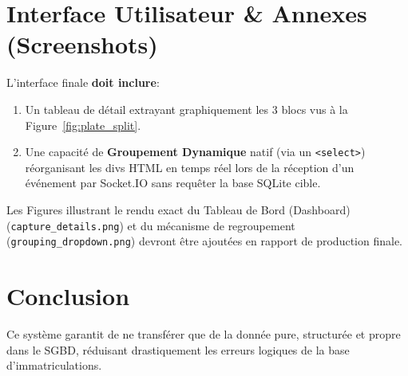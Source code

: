 \documentclass[11pt,a4paper]{article}
\begin{document}
\section{Interface Utilisateur \& Annexes (Screenshots)}
L'interface finale \textbf{doit inclure}:
\begin{enumerate}
    \item Un tableau de d\'etail extrayant graphiquement les 3 blocs vus \`a la Figure~\ref{fig:plate_split}.
    \item Une capacit\'e de \textbf{Groupement Dynamique} natif (via un \texttt{<select>}) r\'eorganisant les divs HTML en temps r\'eel lors de la r\'eception d'un \'ev\'enement par Socket.IO sans requ\^eter la base SQLite cible.
\end{enumerate}
Les Figures illustrant le rendu exact du Tableau de Bord (Dashboard) (\texttt{capture\_details.png}) et du m\'ecanisme de regroupement (\texttt{grouping\_dropdown.png}) devront \^etre ajout\'ees en rapport de production finale.

\section{Conclusion}
Ce syst\`eme garantit de ne transf\'erer que de la donn\'ee pure, structur\'ee et propre dans le SGBD, r\'eduisant drastiquement les erreurs logiques de la base d'immatriculations.
\end{document}

